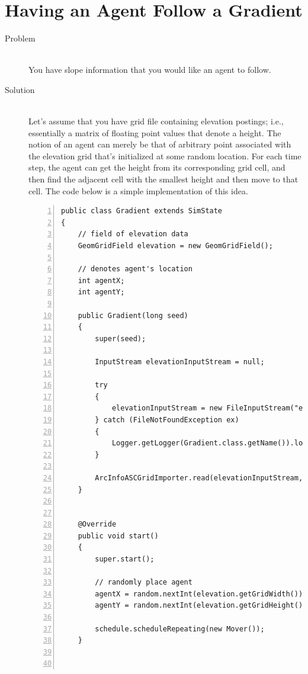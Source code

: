 \documentclass[twoside,10pt]{book}
\begin{document}
\section{Having an Agent Follow a Gradient}
\label{sec:followinggradients}

\begin{description}
\item[Problem]~\\
You have slope information that you would like an agent to follow.

\item[Solution]~\\
  Let's assume that you have grid file containing elevation postings;
  i.e., essentially a matrix of floating point values that denote a
  height.  The notion of an agent can merely be that of arbitrary
  point associated with the elevation grid that's initialized at some
  random location.  For each time step, the agent can get the height
  from its corresponding grid cell, and then find the adjacent cell
  with the smallest height and then move to that cell.  The code below
  is a simple implementation of this idea.

\begin{Verbatim}[frame=lines,framesep=5mm,label=Your SimStateClass,numbers=left,commandchars=^\[\]]
public class Gradient extends SimState
{
    // field of elevation data
    GeomGridField elevation = new GeomGridField();

    // denotes agent's location
    int agentX;
    int agentY;

    public Gradient(long seed)
    {
        super(seed);

        InputStream elevationInputStream = null;

        try
        {
            elevationInputStream = new FileInputStream("elevations.asc");
        } catch (FileNotFoundException ex)
        {
            Logger.getLogger(Gradient.class.getName()).log(Level.SEVERE, null, ex);
        }

        ArcInfoASCGridImporter.read(elevationInputStream, GridDataType.DOUBLE, elevation);
    }


    @Override
    public void start()
    {
        super.start();

        // randomly place agent
        agentX = random.nextInt(elevation.getGridWidth());
        agentY = random.nextInt(elevation.getGridHeight());

        schedule.scheduleRepeating(new Mover());
    }



\end{Verbatim}
\end{description}
\end{document}
